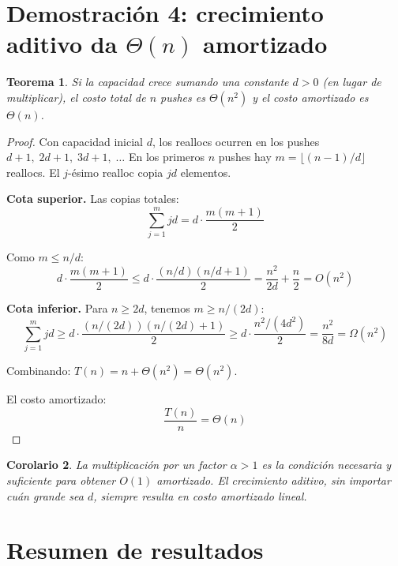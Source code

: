\documentclass[11pt, letterpaper]{article}
\theoremstyle{definition}
\theoremstyle{plain}
\newtheorem{theorem}{Teorema}[section]
\newtheorem{corollary}[theorem]{Corolario}
\theoremstyle{remark}
\begin{document}
\section{Demostración 4: crecimiento aditivo da
  \texorpdfstring{$\Theta(n)$}{Θ(n)} amortizado}

\begin{theorem}\label{thm:additive}
Si la capacidad crece sumando una constante $d > 0$ (en lugar de
multiplicar), el costo total de $n$ pushes es $\Theta(n^2)$ y el costo
amortizado es $\Theta(n)$.
\end{theorem}

\begin{proof}
Con capacidad inicial $d$, los reallocs ocurren en los pushes
$d{+}1,\; 2d{+}1,\; 3d{+}1,\; \ldots$ En los primeros $n$ pushes hay
$m = \bigl\lfloor (n-1)/d \bigr\rfloor$ reallocs. El $j$-ésimo realloc
copia $jd$ elementos.

\textbf{Cota superior.} Las copias totales:
\[
  \sum_{j=1}^{m} jd = d \cdot \frac{m(m+1)}{2}
\]

Como $m \leq n/d$:
\[
  d \cdot \frac{m(m+1)}{2}
  \leq d \cdot \frac{(n/d)(n/d + 1)}{2}
  = \frac{n^2}{2d} + \frac{n}{2}
  = O(n^2)
\]

\textbf{Cota inferior.} Para $n \geq 2d$, tenemos $m \geq n/(2d)$:
\[
  \sum_{j=1}^{m} jd
  \geq d \cdot \frac{(n/(2d))(n/(2d)+1)}{2}
  \geq d \cdot \frac{n^2/(4d^2)}{2}
  = \frac{n^2}{8d}
  = \Omega(n^2)
\]

Combinando: $T(n) = n + \Theta(n^2) = \Theta(n^2)$.

El costo amortizado:
\[
  \frac{T(n)}{n} = \Theta(n)
\]
\end{proof}

\begin{corollary}
La multiplicación por un factor $\alpha > 1$ es la condición necesaria
y suficiente para obtener $O(1)$ amortizado. El crecimiento aditivo,
sin importar cuán grande sea $d$, siempre resulta en costo amortizado
lineal.
\end{corollary}

\section{Resumen de resultados}
\end{document}

